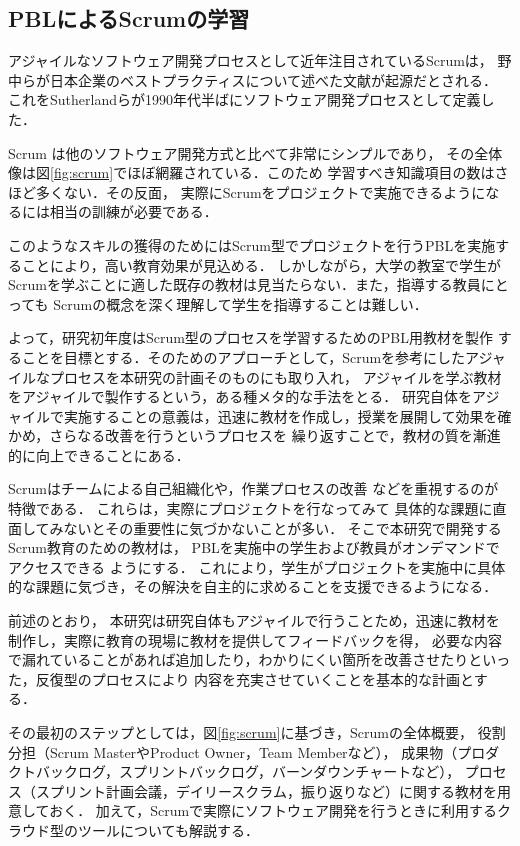 \documentclass[a4j,9pt,twoside,twocolumn]{jsarticle}
\begin{document}
\subsection{PBLによるScrumの学習}
	アジャイルなソフトウェア開発プロセスとして近年注目されているScrumは，
	野中らが日本企業のベストプラクティスについて述べた文献\cite{nonaka}が起源だとされる．
	これをSutherlandらが1990年代半ばにソフトウェア開発プロセスとして定義した．
	
	Scrum は他のソフトウェア開発方式と比べて非常にシンプルであり，
	その全体像は図\ref{fig:scrum}でほぼ網羅されている．このため
	学習すべき知識項目の数はさほど多くない．その反面，
	実際にScrumをプロジェクトで実施できるようになるには相当の訓練が必要である．

	このようなスキルの獲得のためにはScrum型でプロジェクトを行うPBLを実施することにより，高い教育効果が見込める．
	しかしながら，大学の教室で学生がScrumを学ぶことに適した既存の教材は見当たらない．また，指導する教員にとっても
	Scrumの概念を深く理解して学生を指導することは難しい．

	よって，研究初年度はScrum型のプロセスを学習するためのPBL用教材を製作
	することを目標とする．そのためのアプローチとして，Scrumを参考にしたアジャイルなプロセスを本研究の計画そのものにも取り入れ，
	アジャイルを学ぶ教材をアジャイルで製作するという，ある種メタ的な手法をとる．
	研究自体をアジャイルで実施することの意義は，迅速に教材を作成し，授業を展開して効果を確かめ，さらなる改善を行うというプロセスを
	繰り返すことで，教材の質を漸進的に向上できることにある．
	
	Scrumはチームによる自己組織化や，作業プロセスの改善
	などを重視するのが特徴である．
	これらは，実際にプロジェクトを行なってみて
	具体的な課題に直面してみないとその重要性に気づかないことが多い．
	そこで本研究で開発するScrum教育のための教材は，
	PBLを実施中の学生および教員がオンデマンドでアクセスできる
	ようにする．
	これにより，学生がプロジェクトを実施中に具体的な課題に気づき，その解決を自主的に求めることを支援できるようになる．
	
	前述のとおり，
	本研究は研究自体もアジャイルで行うことため，迅速に教材を制作し，実際に教育の現場に教材を提供してフィードバックを得，
	必要な内容で漏れていることがあれば追加したり，わかりにくい箇所を改善させたりといった，反復型のプロセスにより
	内容を充実させていくことを基本的な計画とする．
	
	その最初のステップとしては，図\ref{fig:scrum}に基づき，Scrumの全体概要，
	役割分担（Scrum MasterやProduct Owner，Team Memberなど），
	成果物（プロダクトバックログ，スプリントバックログ，バーンダウンチャートなど），
	プロセス（スプリント計画会議，デイリースクラム，振り返りなど）に関する教材を用意しておく．
	加えて，Scrumで実際にソフトウェア開発を行うときに利用するクラウド型のツールについても解説する．
\end{document}
